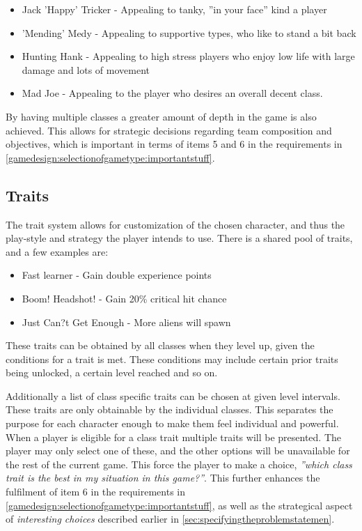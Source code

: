 \begin{itemize}
\item Jack 'Happy' Tricker - Appealing to tanky, ''in your face'' kind a player
\item 'Mending' Medy - Appealing to supportive types, who like to stand a bit back
\item Hunting Hank - Appealing to high stress players who enjoy low life with large damage and lots of movement
\item Mad Joe - Appealing to the player who desires an overall decent class. 
\end{itemize}

By having multiple classes a greater amount of depth in the game is also achieved. This allows for strategic decisions regarding team composition and objectives, which is important in terms of items 5 and 6 in the requirements in \ref{gamedesign:selectionofgametype:importantstuff}.

\subsection*{Traits}\label{gamedesign:ourgame:traits}
The trait system allows for customization of the chosen character, and thus the play-style and strategy the player intends to use.
There is a shared pool of traits, and a few examples are:
\begin{itemize}
\item Fast learner - Gain double experience points
\item Boom! Headshot!  - Gain 20\% critical hit chance
\item Just Can?t Get Enough - More aliens will spawn
\end{itemize} 
These traits can be obtained by all classes when they level up, given the conditions for a trait is met. These conditions may include certain prior traits being unlocked, a certain level reached and so on.

Additionally a list of class specific traits can be chosen at given level intervals. 
These traits are only obtainable by the individual classes. This separates the purpose for each character enough to make them feel individual and powerful. When a player is eligible for a class trait multiple traits will be presented. The player may only select one of these, and the other options will be unavailable for the rest of the current game. This force the player to make a choice, \emph{''which class trait is the best in my situation in this game?''}. 
This further enhances the fulfilment of item 6 in the requirements in \ref{gamedesign:selectionofgametype:importantstuff}, as well as the strategical aspect of \emph{interesting choices} described earlier in \ref{sec:specifyingtheproblemstatemen}.

